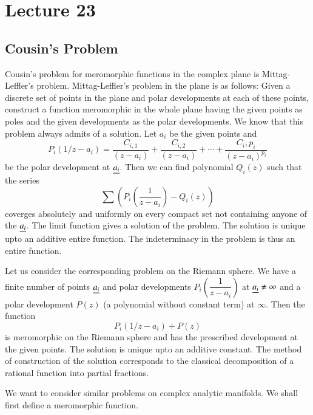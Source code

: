 \chapter{Lecture 23}

\section*{Cousin's Problem}\pageoriginale

Cousin's problem for meromorphic functions in the complex plane is
Mittag-Leffler's problem. Mittag-Leffler's problem in the plane is as
follows: Given a discrete set of points in the plane and polar
developments at each of these points, construct a function meromorphic
in the whole plane having the given points as poles and the given
developments as the polar developments. We know that this problem
always admits of a solution. Let $a_{i}$ be the given points and
$$
P_{i}(1/z-a_{i})=\frac{C_{i,1}}{(z-a_{i})}+\frac{C_{i,2}}{(z-a_{i})} +
\cdots+\frac{C_i, p_i}{(z-a_{i})^{p_{i}}} 
$$
be the polar development at $\underline{a_{i}}$. Then we can find polynomial
$Q_{i}(z)$ such that the series
$$
\sum(P_{i}\left(\frac{1}{z-a_{i}}\right)-Q_{i}(z))
$$
coverges absolutely and uniformly on every compact set not containing
anyone of the $\underline{a_{i}}$. The limit function gives a solution of the
problem. The solution is unique upto an additive entire function. The
indeterminacy in the problem is thus an entire function.

Let us consider the corresponding problem on the Riemann sphere. We
have a finite number of points $\underline{a_{i}}$ and polar developments
$P_{i}\left(\dfrac{1}{z-a_{i}}\right)$ at $\underline{a_{i}}\neq \infty$ and a polar
development $P(z)$ (a polynomial without constant term) at
$\infty$. Then the function
$$
P_{i}(1/z-a_{i})+P(z)
$$\pageoriginale
is meromorphic on the Riemann sphere and has the prescribed
development at the given points. The solution is unique upto an
additive constant. The method of construction of the solution
corresponds to the classical decomposition of a rational function into
partial fractions.

We want to consider similar problems on complex analytic manifolds. We
shall first define a meromorphic function.

